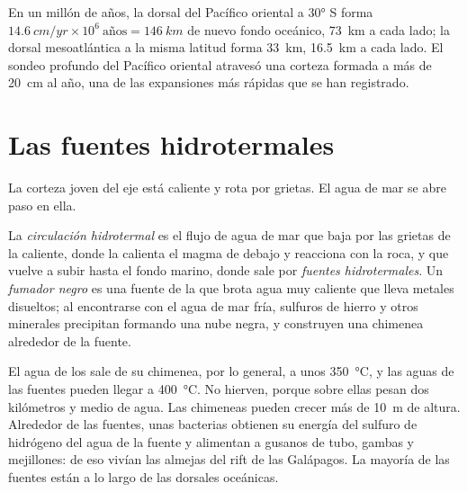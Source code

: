 \begin{example}\label{ex:g11:ocean-ridges:rates}
En un millón de años, la dorsal del Pacífico oriental a \ang{30} S forma
$\qty{14.6}{cm/yr} \times 10^6\ \text{años} = \qty{146}{km}$ de nuevo fondo
oceánico, \qty{73}{km} a cada lado; la dorsal mesoatlántica a la misma latitud
forma \qty{33}{km}, \qty{16.5}{km} a cada lado. El sondeo profundo del
Pacífico oriental atravesó una corteza formada a más de \qty{20}{cm} al año,
una de las expansiones más rápidas que se han registrado.
\end{example}

\section{Las fuentes hidrotermales}

La corteza joven del eje está caliente y rota por grietas. El agua de mar se
abre paso en ella.

\begin{definition}\label{def:g11:ocean-ridges:hydrothermal}
La \emph{circulación hidrotermal} es el flujo
de agua de mar que baja por las grietas de la  caliente, donde
la calienta el magma de debajo y reacciona con la roca, y que vuelve a subir
hasta el fondo marino, donde sale por \emph{fuentes hidrotermales}. Un
\emph{fumador negro} es una fuente de la que brota agua
muy caliente que lleva metales disueltos; al encontrarse con el agua de mar
fría, sulfuros de hierro y otros minerales precipitan formando una nube negra,
y construyen una chimenea alrededor de la fuente.
\end{definition}

El agua de los  sale de su chimenea, por lo general, a unos
\qty{350}{\celsius}, y las aguas de las fuentes pueden llegar a
\qty{400}{\celsius}. No hierven, porque sobre ellas pesan dos kilómetros y medio
de agua. Las chimeneas pueden crecer más de \qty{10}{m} de altura. Alrededor
de las fuentes, unas bacterias obtienen su energía del sulfuro de hidrógeno
del agua de la fuente y alimentan a gusanos de tubo, gambas y mejillones: de
eso vivían las almejas del rift de las Galápagos. La mayoría de las fuentes
están a lo largo de las dorsales oceánicas.

